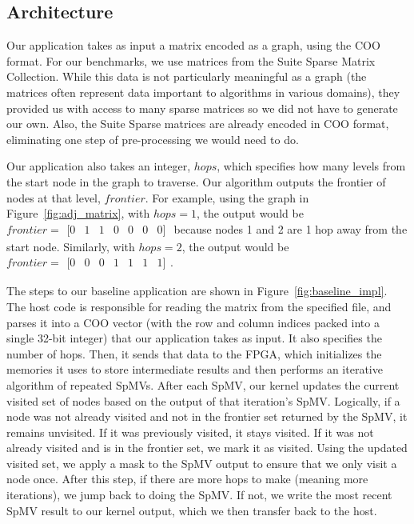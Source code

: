 \documentclass[10pt]{article}
\newcommand{\irow}[1]{%
  \begin{smallmatrix}[#1]\end{smallmatrix}%
}
\begin{document}
\subsection{Architecture}

\noindent Our application takes as input a matrix encoded as a graph, using the COO
format. For our benchmarks, we use matrices from the Suite Sparse Matrix
Collection. While this data is not particularly meaningful as a graph (the
matrices often represent data important to algorithms in various domains), they
provided us with access to many sparse matrices so we did not have to generate
our own. Also, the Suite Sparse matrices are already encoded in COO format,
eliminating one step of pre-processing we would need to do. \newline

\noindent Our application also takes an integer, $hops$, which specifies how many levels
from the start node in the graph to traverse. Our algorithm outputs the frontier
of nodes at that level, $frontier$. For example, using the graph in
Figure~\ref{fig:adj_matrix}, with $hops=1$, the output would be $frontier =
\irow{0 & 1 & 1 & 0 & 0 & 0 & 0}$ because nodes 1 and 2 are 1 hop away from the
start node. Similarly, with $hops=2$, the output would be $frontier=\irow{0 & 0
& 0 & 1 & 1 & 1 & 1}$. \newline

\noindent The steps to our baseline application are shown in
Figure~\ref{fig:baseline_impl}. The host code is responsible for reading the
matrix from the specified file, and parses it into a COO vector (with the row
and column indices packed into a single 32-bit integer) that our application
takes as input. It also specifies the number of hops. Then, it sends that data
to the FPGA, which initializes the memories it uses to store intermediate
results and then performs an iterative algorithm of repeated SpMVs. After each
SpMV, our kernel updates the current visited set of nodes based on the output of
that iteration's SpMV. Logically, if a node was not already visited and not in
the frontier set returned by the SpMV, it remains unvisited. If it was
previously visited, it stays visited. If it was not already visited and is in
the frontier set, we mark it as visited. Using the updated visited set, we apply
a mask to the SpMV output to ensure that we only visit a node once. After this
step, if there are more hops to make (meaning more iterations), we jump back to
doing the SpMV. If not, we write the most recent SpMV result to our kernel
output, which we then transfer back to the host. \newline
\end{document}
